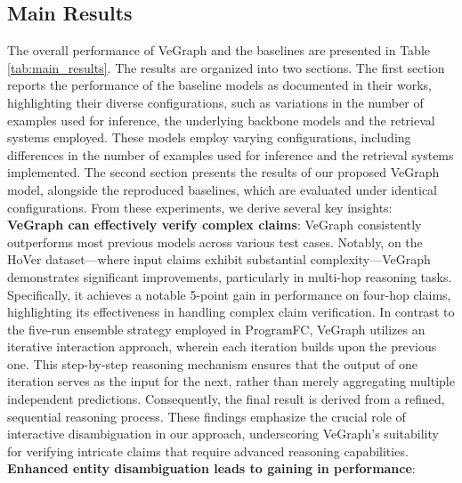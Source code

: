 \documentclass[11pt]{article}
\begin{document}
\subsection{Main Results}
The overall performance of VeGraph and the baselines are presented in Table \ref{tab:main_results}. The results are organized into two sections. The first section reports the performance of the baseline models as documented in their works, highlighting their diverse configurations, such as variations in the number of examples used for inference, the underlying backbone models and the retrieval systems employed. These models employ varying configurations, including differences in the number of examples used for inference and the retrieval systems implemented. The second section presents the results of our proposed VeGraph model, alongside the reproduced baselines, which are evaluated under identical configurations. From these experiments, we derive several key insights:
\\
\textbf{VeGraph can effectively verify complex claims}: 
VeGraph consistently outperforms most previous models across various test cases. Notably, on the HoVer dataset—where input claims exhibit substantial complexity—VeGraph demonstrates significant improvements, particularly in multi-hop reasoning tasks. Specifically, it achieves a notable 5-point gain in performance on four-hop claims, highlighting its effectiveness in handling complex claim verification. In contrast to the five-run ensemble strategy employed in ProgramFC, VeGraph utilizes an iterative interaction approach, wherein each iteration builds upon the previous one. This step-by-step reasoning mechanism ensures that the output of one iteration serves as the input for the next, rather than merely aggregating multiple independent predictions. Consequently, the final result is derived from a refined, sequential reasoning process. These findings emphasize the crucial role of interactive disambiguation in our approach, underscoring VeGraph's suitability for verifying intricate claims that require advanced reasoning capabilities.
\\
\textbf{Enhanced entity disambiguation leads to gaining in performance}:
\end{document}
